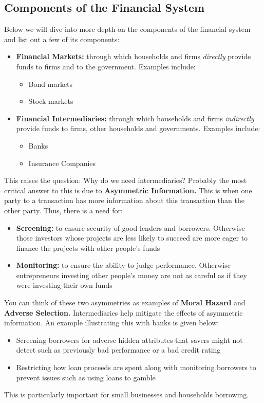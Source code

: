 \documentclass[12pt, letterpaper]{article}
\begin{document}
\subsection{Components of the Financial System}
Below we will dive into more depth on the components of the financial system and list out a few of its components:
\begin{itemize}
	\item \textbf{Financial Markets:} through which households and firms \textit{directly} provide funds to firms and to the government. Examples include:
		\begin{itemize}
			\item Bond markets
			\item Stock markets
		\end{itemize}
	\item \textbf{Financial Intermediaries:} through which households and firms \textit{indirectly} provide funds to firms, other households and governments. Examples include:
		\begin{itemize}
			\item Banks
			\item Insurance Companies
		\end{itemize}
\end{itemize}
This raises the question: Why do we need intermediaries? Probably the most critical answer to this is due to \textbf{Asymmetric Information.} This is when one party to a transaction has more information about this transaction than the other party. Thus, there is a need for:
\begin{itemize}
	\item \textbf{Screening:} to ensure security of good lenders and borrowers. Otherwise those investors whose projects are less likely to succeed are more eager to finance the projects with other people's funds
	\item \textbf{Monitoring:} to ensure the ability to judge performance. Otherwise entrepreneurs investing other people's money are not as careful as if they were investing their own funds
\end{itemize}
You can think of these two asymmetries as examples of \textbf{Moral Hazard} and \textbf{Adverse Selection.} Intermediaries help mitigate the effects of asymmetric information. An example illustrating this with banks is given below:
\begin{itemize}
	\item Screening borrowers for adverse hidden attributes that savers might not detect such as previously bad performance or a bad credit rating
	\item Restricting how loan proceeds are spent along with monitoring borrowers to prevent issues such as using loans to gamble
\end{itemize}
This is particularly important for small businesses and households borrowing.
\end{document}
